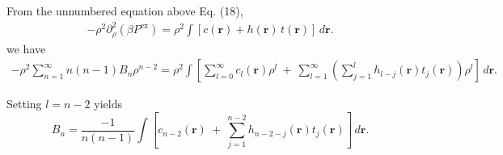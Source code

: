 \documentclass[preprint]{revtex4-1}
\numberwithin{equation}{subsection}
\numberwithin{table}{section}
\newcommand{\vct}[1]{\mathbf{#1}}
\providecommand{\vr}{} %
\renewcommand{\vr}{\vct{r}}
\newcommand{\supex}[1]{ { { #1 }^{ \mathrm{ex} } } }
\newcommand{\Pex}{\supex{P}}
\begin{document}
From the unnumbered equation above Eq. (18),
\begin{align*}
  -\rho^2 \partial^2_\rho (\beta \Pex)
=
  \rho^2 \int \left[
    c(\vr) + h(\vr) \, t(\vr)
  \right] \, d\vr.
\end{align*}
we have
\begin{align*}
  -\rho^2 \sum_{n = 1}^\infty
  n (n - 1) B_n \rho^{n - 2}
=
  \rho^2 \int \left[
    \sum_{l = 0}^\infty c_l(\vr) \rho^l  \
    + \
    \sum_{l = 1}^\infty
      \left( \sum_{j=1}^{l} h_{l-j}(\vr) t_j(\vr) \right) \rho^l
  \right] \, d\vr.
\end{align*}

Setting $l = n - 2$ yields
\begin{equation}
  B_n
=
  \frac{-1}{n(n-1)}
   \int \left[
     c_{n-2}(\vr) \
    + \
      \sum_{j=1}^{n-2} h_{n-2-j}(\vr) t_j(\vr)
  \right] \, d\vr.
\tag{18}
\label{eq:Bnxi}
\end{equation}
\end{document}
